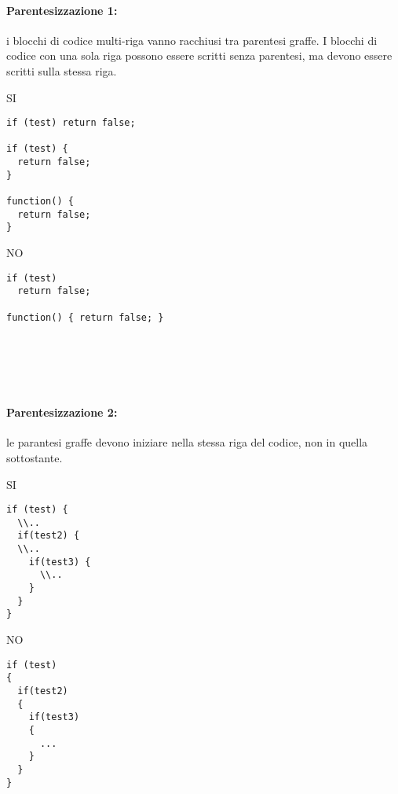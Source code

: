 \documentclass[../ProcessiPrimari.tex]{subfiles}
\begin{document}
\paragraph{Parentesizzazione 1:}i blocchi di codice multi-riga vanno racchiusi tra parentesi graffe.
I blocchi di codice con una sola riga possono essere scritti senza parentesi, ma devono essere scritti sulla stessa riga.\\
\begin{center}{
\begin{minipage}{6.5cm}
{\begin{center}SI\end{center}}
\begin{Verbatim}[frame=single]
if (test) return false;

if (test) {
  return false;
}

function() {
  return false;
}
\end{Verbatim}
\end{minipage}
\hfil
\begin{minipage}{6.5cm}
	{\begin{center}NO\end{center}}
	\begin{Verbatim}[frame=single]
if (test)
  return false;
  
function() { return false; }




  
	\end{Verbatim}
\end{minipage}
}
\end{center}
\paragraph{Parentesizzazione 2:} le parantesi graffe devono iniziare nella stessa riga del codice, non in quella sottostante.

\begin{center}{
\begin{minipage}{6cm}
	{\begin{center}SI\end{center}}
	\begin{Verbatim}[frame=single]
if (test) {
  \\..
  if(test2) {
  \\..
    if(test3) {
	  \\..
    }
  }
}

	\end{Verbatim}
\end{minipage}
\hfil
\begin{minipage}{6cm}
	{\begin{center}NO\end{center}}
	\begin{Verbatim}[frame=single]
if (test) 
{
  if(test2)
  {
    if(test3)
    {
      ...
    }
  }
}
	\end{Verbatim}
\end{minipage}
}
\end{center}	
\end{document}

